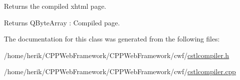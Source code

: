 Returns the compiled xhtml page. 

\begin{DoxyReturn}{Returns}
Q\+Byte\+Array \+: Compiled page. 
\end{DoxyReturn}


The documentation for this class was generated from the following files\+:\begin{DoxyCompactItemize}
\item 
/home/herik/\+C\+P\+P\+Web\+Framework/\+C\+P\+P\+Web\+Framework/cwf/\hyperlink{cstlcompiler_8h}{cstlcompiler.\+h}\item 
/home/herik/\+C\+P\+P\+Web\+Framework/\+C\+P\+P\+Web\+Framework/cwf/\hyperlink{cstlcompiler_8cpp}{cstlcompiler.\+cpp}\end{DoxyCompactItemize}
